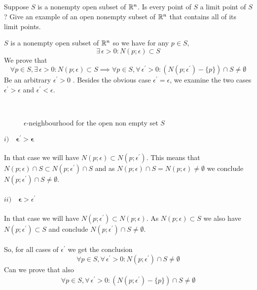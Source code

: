 \subsection{}
\begin{tcolorbox}

Suppose $S$ is a nonempty open subset of $\mathbb{R}^n$. Is every point of $S$ a limit point of $S$? Give an example of an open nonempty subset of $\mathbb{R}^n$ that contains all of its limit points.
\end{tcolorbox}
$S$ is a nonempty open subset of $\mathbb{R}^n$ so we have for any $p\in S$,
$$\exists \, \epsilon>0: N(p;\epsilon)\subset S$$
We prove that 
$$\forall p\in S, \exists \, \epsilon>0: N(p;\epsilon)\subset S \implies \forall p\in S, \forall\, \epsilon^{'}>0: \left(N(p;\epsilon^{'})-\{p\}\right)\cap S\neq \emptyset $$
Be an arbitrary $\epsilon^{'}>0$ . Besides the obvious case $\epsilon^{'}=\epsilon$, we examine the two cases $\epsilon^{'}>\epsilon$ and $\epsilon^{'}<\epsilon$.\\\begin{figure}[H]%
    \centering
\\
\caption{$\epsilon$-neighbourhood for the open non empty set $S$   }
\label{fig:fig_p8a}
\end{figure}
$i)\quad \mathbf{\epsilon^{'}>\epsilon}$\\\\
In that case we will have $N(p;\epsilon)\subset N(p;\epsilon^{'})$. This means that $N(p;\epsilon)\cap S \subset N(p;\epsilon^{'})\cap S$ and as $N(p;\epsilon)\cap S = N(p;\epsilon)\neq \emptyset$ we conclude $N(p;\epsilon^{'})\cap S\neq \emptyset$.\\\\
$ii)\quad \mathbf{\epsilon}>\epsilon^{'}$\\\\
In that case we will have $N(p;\epsilon^{'})\subset N(p;\epsilon)$. As $N(p;\epsilon)\subset S$ we also have $N(p;\epsilon^{'})\subset S$ and conclude $N(p;\epsilon^{'})\cap S\neq \emptyset$.\\\\
So, for all cases of $\epsilon^{'}$ we get the conclusion 
$$\forall p\in S, \forall\, \epsilon^{'}>0: N(p;\epsilon^{'})\cap S\neq \emptyset $$ Can we prove that also
\begin{align}
\forall p\in S, \forall\, \epsilon^{'}>0: \left(N(p;\epsilon^{'})-\{p\}\right)\cap S\neq \emptyset
\end{align}
